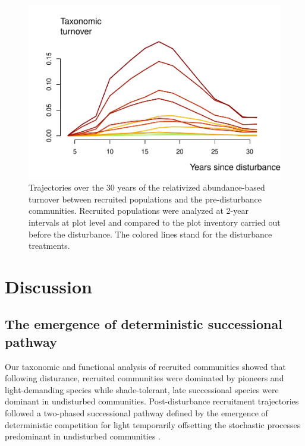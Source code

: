 \documentclass[fleqn,10pt]{ArtEcoFoG} %
\begin{document}
\begin{figure}

{\centering \includegraphics[width=1\linewidth]{RecruitmentTrajectories_files/figure-latex/Turnover-1} 

}

\caption{ Trajectories over the 30 years of the relativized abundance-based turnover between recruited populations and the pre-disturbance communities. Recruited populations were analyzed at 2-year intervals at plot level and compared to the plot inventory carried out before the disturbance. The colored lines stand for the disturbance treatments.}\label{fig:Turnover}
\end{figure}

\hypertarget{discussion}{%
\section{Discussion}\label{discussion}}

\hypertarget{the-emergence-of-deterministic-successional-pathway}{%
\subsection{The emergence of deterministic successional pathway}\label{the-emergence-of-deterministic-successional-pathway}}

Our taxonomic and functional analysis of recruited communities showed that following disturance, recruited communities were dominated by pioneers and light-demanding species while shade-tolerant, late successional species were dominant in undisturbed communities.
Post-disturbance recruitment trajectories followed a two-phased successional pathway defined by the emergence of deterministic competition for light temporarily offsetting the stochastic processes predominant in undisturbed communities \citep{Clements1916, Denslow2000, Meiners2015}.
\end{document}
